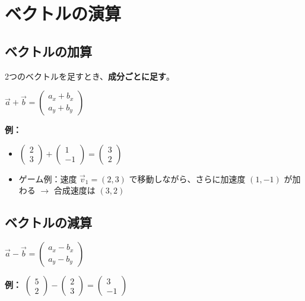 \documentclass[paper=a4,fleqn]{jlreq}
\newcommand{\formula}[1]{%
  \vspace{4pt}%
  \begin{center}{\large\bfseries\boldmath\(\displaystyle #1\)}\end{center}%
  \vspace{4pt}%
}
\begin{document}
\newpage
\section{ベクトルの演算}

\subsection{ベクトルの加算}

2つのベクトルを足すとき、\textbf{成分ごとに足す}。

\formula{\vec{a} + \vec{b} = \begin{pmatrix} a_x + b_x \\ a_y + b_y \end{pmatrix}}

\textbf{例：}
\begin{itemize}
  \item \(\begin{pmatrix} 2 \\ 3 \end{pmatrix} + \begin{pmatrix} 1 \\ -1 \end{pmatrix} = \begin{pmatrix} 3 \\ 2 \end{pmatrix}\)
  \item ゲーム例：速度 \(\vec{v}_1 = (2, 3)\) で移動しながら、さらに加速度 \((1, -1)\) が加わる \(\rightarrow\) 合成速度は \((3, 2)\)
\end{itemize}

\subsection{ベクトルの減算}

\formula{\vec{a} - \vec{b} = \begin{pmatrix} a_x - b_x \\ a_y - b_y \end{pmatrix}}

\textbf{例：} \(\begin{pmatrix} 5 \\ 2 \end{pmatrix} - \begin{pmatrix} 2 \\ 3 \end{pmatrix} = \begin{pmatrix} 3 \\ -1 \end{pmatrix}\)
\end{document}

